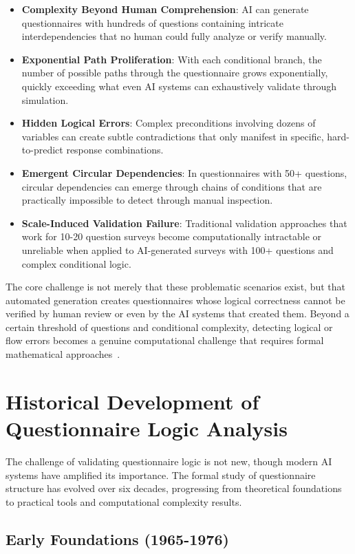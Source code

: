 \begin{itemize}
    \item \textbf{Complexity Beyond Human Comprehension}: AI can generate questionnaires with hundreds of questions containing intricate interdependencies that no human could fully analyze or verify manually.
    \item \textbf{Exponential Path Proliferation}: With each conditional branch, the number of possible paths through the questionnaire grows exponentially, quickly exceeding what even AI systems can exhaustively validate through simulation.
    \item \textbf{Hidden Logical Errors}: Complex preconditions involving dozens of variables can create subtle contradictions that only manifest in specific, hard-to-predict response combinations.
    \item \textbf{Emergent Circular Dependencies}: In questionnaires with 50+ questions, circular dependencies can emerge through chains of conditions that are practically impossible to detect through manual inspection.
    \item \textbf{Scale-Induced Validation Failure}: Traditional validation approaches that work for 10-20 question surveys become computationally intractable or unreliable when applied to AI-generated surveys with 100+ questions and complex conditional logic.
\end{itemize}

The core challenge is not merely that these problematic scenarios exist, but that automated generation creates questionnaires whose logical correctness cannot be verified by human review or even by the AI systems that created them. Beyond a certain threshold of questions and conditional complexity, detecting logical or flow errors becomes a genuine computational challenge that requires formal mathematical approaches~\cite{willenborg1995testing}.

\clearpage
\section{Historical Development of Questionnaire Logic Analysis}

The challenge of validating questionnaire logic is not new, though modern AI systems have amplified its importance. The formal study of questionnaire structure has evolved over six decades, progressing from theoretical foundations to practical tools and computational complexity results.

\subsection{Early Foundations (1965-1976)}

